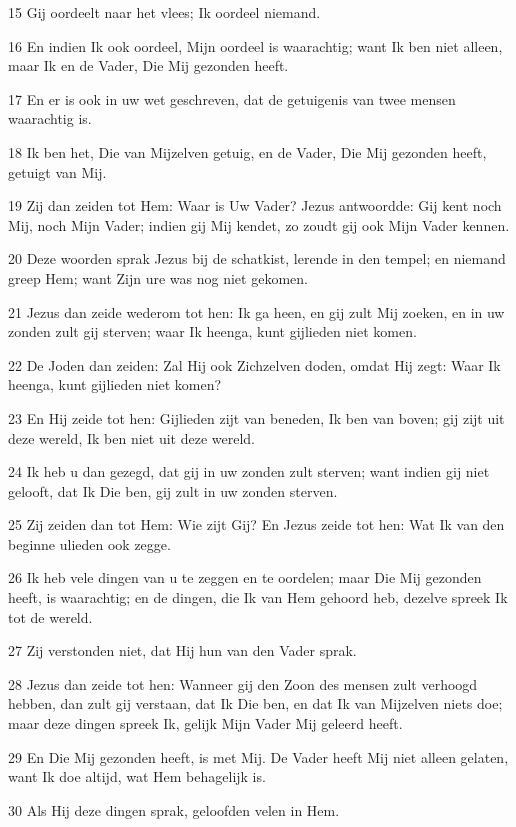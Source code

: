 \par 15 Gij oordeelt naar het vlees; Ik oordeel niemand.
\par 16 En indien Ik ook oordeel, Mijn oordeel is waarachtig; want Ik ben niet alleen, maar Ik en de Vader, Die Mij gezonden heeft.
\par 17 En er is ook in uw wet geschreven, dat de getuigenis van twee mensen waarachtig is.
\par 18 Ik ben het, Die van Mijzelven getuig, en de Vader, Die Mij gezonden heeft, getuigt van Mij.
\par 19 Zij dan zeiden tot Hem: Waar is Uw Vader? Jezus antwoordde: Gij kent noch Mij, noch Mijn Vader; indien gij Mij kendet, zo zoudt gij ook Mijn Vader kennen.
\par 20 Deze woorden sprak Jezus bij de schatkist, lerende in den tempel; en niemand greep Hem; want Zijn ure was nog niet gekomen.
\par 21 Jezus dan zeide wederom tot hen: Ik ga heen, en gij zult Mij zoeken, en in uw zonden zult gij sterven; waar Ik heenga, kunt gijlieden niet komen.
\par 22 De Joden dan zeiden: Zal Hij ook Zichzelven doden, omdat Hij zegt: Waar Ik heenga, kunt gijlieden niet komen?
\par 23 En Hij zeide tot hen: Gijlieden zijt van beneden, Ik ben van boven; gij zijt uit deze wereld, Ik ben niet uit deze wereld.
\par 24 Ik heb u dan gezegd, dat gij in uw zonden zult sterven; want indien gij niet gelooft, dat Ik Die ben, gij zult in uw zonden sterven.
\par 25 Zij zeiden dan tot Hem: Wie zijt Gij? En Jezus zeide tot hen: Wat Ik van den beginne ulieden ook zegge.
\par 26 Ik heb vele dingen van u te zeggen en te oordelen; maar Die Mij gezonden heeft, is waarachtig; en de dingen, die Ik van Hem gehoord heb, dezelve spreek Ik tot de wereld.
\par 27 Zij verstonden niet, dat Hij hun van den Vader sprak.
\par 28 Jezus dan zeide tot hen: Wanneer gij den Zoon des mensen zult verhoogd hebben, dan zult gij verstaan, dat Ik Die ben, en dat Ik van Mijzelven niets doe; maar deze dingen spreek Ik, gelijk Mijn Vader Mij geleerd heeft.
\par 29 En Die Mij gezonden heeft, is met Mij. De Vader heeft Mij niet alleen gelaten, want Ik doe altijd, wat Hem behagelijk is.
\par 30 Als Hij deze dingen sprak, geloofden velen in Hem.
